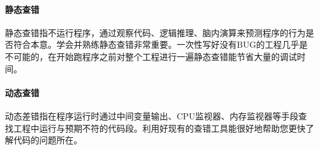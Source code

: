 \documentclass[
]{article}
\begin{document}
\hypertarget{ux9759ux6001ux67e5ux9519}{%
\paragraph{静态查错}\label{ux9759ux6001ux67e5ux9519}}

静态查错指不运行程序，通过观察代码、逻辑推理、脑内演算来预测程序的行为是否符合本意。学会并熟练静态查错非常重要。一次性写好没有BUG的工程几乎是不可能的，在开始跑程序之前对整个工程进行一遍静态查错能节省大量的调试时间。

\hypertarget{ux52a8ux6001ux67e5ux9519}{%
\paragraph{动态查错}\label{ux52a8ux6001ux67e5ux9519}}

动态差错指在程序运行时通过中间变量输出、CPU监视器、内存监视器等手段查找工程中运行与预期不符的代码段。利用好现有的查错工具能很好地帮助您更快了解代码的问题所在。
\end{document}
